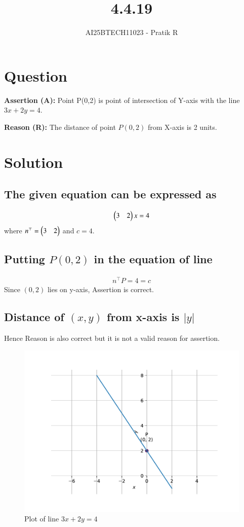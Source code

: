 \documentclass[journal]{IEEEtran}
\begin{document}

\vspace{3cm}

\title{4.4.19}
\author{AI25BTECH11023 - Pratik R}
{\let\newpage\relax\maketitle}

\renewcommand{\thefigure}{\theenumi}
\renewcommand{\thetable}{\theenumi}
\setlength{\intextsep}{10pt} %


\renewcommand{\thetable}{\theenumi}


\section*{\textbf{Question}}
\textbf{Assertion (A):} Point P(0,2) is point of intersection of Y-axis with the line
$3x + 2y = 4$.

\textbf{Reason (R):} The distance of point $P(0,2)$ from X-axis is 2 units. 
\section*{\textbf{Solution}}
\subsection*{\textbf{The given equation can be expressed as}}
\begin{align}
    \begin{pmatrix}3 & 2\end{pmatrix}x =4
\end{align}
where $n^\top = \begin{pmatrix}3&2\end{pmatrix}$ and $c = 4$.

\subsection*{\textbf{Putting $P(0,2)$ in the equation of line}}
\begin{align}
n^\top P =4=c
\end{align}
Since $(0,2)$ lies on y-axis, Assertion is correct.

\subsection*{\textbf{Distance of $(x,y)$ from x-axis is $|y|$}}

Hence Reason is also correct but it is not a valid reason for assertion.
\newpage

\begin{figure}[H]
\centering
\includegraphics[width=0.7\columnwidth]{figs/fig.pdf} 
\caption{Plot of line $3x+2y=4$}
\label{}
\end{figure}
\end{document}
